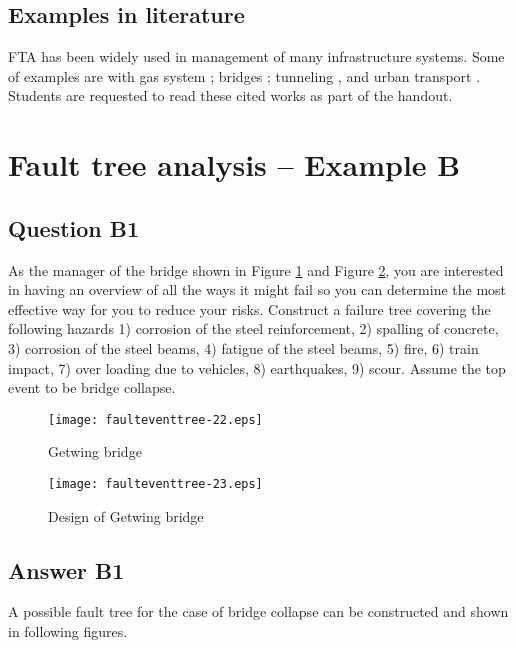 \subsection{Examples in literature}
FTA has been widely used in management of many infrastructure systems. Some of
examples are with gas system \cite{Andrews2012,Tian2012}; bridges \cite{Davis-McDaniel2013,Johnson1999,Sianipar1997,LeBeau2007}; tunneling \cite{You2012}, and urban transport \cite{Ma2014}. Students are requested to read these cited works as part of the handout.
\section{Fault tree analysis -- Example B}
\subsection{Question B1}
As the manager of the bridge shown in Figure \ref{figeventfault:6} and Figure \ref{figeventfault:7},
you are interested in having an overview of all the ways it might fail so you can
determine the most effective way for you to reduce your risks. Construct a
failure tree covering the following hazards 1) corrosion of the steel
reinforcement, 2) spalling of concrete, 3) corrosion of the steel beams, 4)
fatigue of the steel beams, 5) fire, 6) train impact, 7) over loading due to
vehicles, 8) earthquakes, 9) scour. Assume the top event to be bridge collapse.

\begin{figure}[h]
\begin{center}
\texttt{[image: faulteventtree-22.eps]}
\caption{Getwing bridge}\label{figeventfault:6}
\end{center}
\end{figure}


\begin{figure}[h]
\begin{center}
\texttt{[image: faulteventtree-23.eps]}
\caption{Design of Getwing bridge}\label{figeventfault:7}
\end{center}
\end{figure}

\subsection{Answer B1}


A possible fault tree for the case of bridge collapse can be constructed and
shown in following figures.

